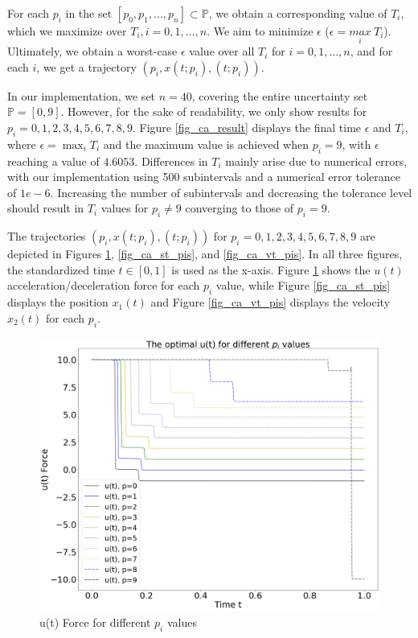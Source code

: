 \documentclass  [
  paper    = a4,
  BCOR     = 10mm,
  twoside,
  fontsize = 12pt,
  fleqn,
  toc      = bibnumbered,
  toc      = listofnumbered,
  numbers  = noendperiod,
  headings = normal,
  listof   = leveldown,
  version  = 3.03
]                                       {scrreprt}
\newcommand{\<}{\langle}
\renewcommand{\>}{\rangle}
\begin{document}
For each $p_i$ in the set $[p_0, p_1, ..., p_n] \subset \mathbb{P}$, we obtain a corresponding value of $T_i$, which we maximize over $T_i, i =0, 1, ..., n$. We aim to minimize $\epsilon$ ($\epsilon = \underset{i}{max} \ T_i$). Ultimately, we obtain a worst-case $\epsilon$ value over all $T_i$ for $i=0,1,...,n$, and for each $i$, we get a trajectory $(p_i, x(t;p_i), (t;p_i))$.

In our implementation, we set $n=40$, covering the entire uncertainty set $\mathbb{P}=[0,9]$. However, for the sake of readability, we only show results for $p_i=0, 1, 2, 3, 4, 5, 6, 7, 8, 9$. Figure \ref{fig_ca_result} displays the final time $\epsilon$ and $T_i$, where $\epsilon = \max_i T_i$ and the maximum value is achieved when $p_i=9$, with $\epsilon$ reaching a value of $4.6053$. Differences in $T_i$ mainly arise due to numerical errors, with our implementation using 500 subintervals and a numerical error tolerance of $1e-6$. Increasing the number of subintervals and decreasing the tolerance level should result in $T_i$ values for $p_i \neq 9$ converging to those of $p_i=9$.

The trajectories $(p_i, x(t;p_i), (t;p_i))$ for $p_i=0, 1, 2, 3, 4, 5, 6, 7, 8, 9$ are depicted in Figures \ref{fig_ca_ut_pis}, \ref{fig_ca_st_pis}, and \ref{fig_ca_vt_pis}. In all three figures, the standardized time $t \in [0,1]$ is used as the x-axis. Figure \ref{fig_ca_ut_pis} shows the $u(t)$ acceleration/deceleration force for each $p_i$ value, while Figure \ref{fig_ca_st_pis} displays the position $x_1(t)$ and Figure \ref{fig_ca_vt_pis} displays the velocity $x_2(t)$ for each $p_i$.



\begin{figure}[H]
	\centerline{\includegraphics[width=13cm]{ca_ut_pis.png}}
	\caption{u(t) Force for different $p_i$ values}
	\label{fig_ca_ut_pis}
\end{figure}
\end{document}
